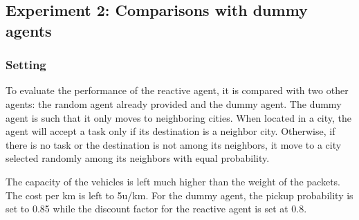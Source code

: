 \documentclass[11pt]{article}
\begin{document}
\subsection{Experiment 2: Comparisons with dummy agents}

\subsubsection{Setting}
To evaluate the performance of the reactive agent, it is compared with two other agents: the random agent already provided and the dummy agent. The dummy agent is such that it only moves to neighboring cities. When located in a city, the agent will accept a task only if its destination is a neighbor city. Otherwise, if there is no task or the destination is not among its neighbors, it move to a city selected randomly among its neighbors with equal probability. 

The capacity of the vehicles is left much higher than the weight of the packets. The cost per km is left to 5u/km. For the dummy agent, the pickup probability is set to 0.85 while the discount factor for the reactive agent is set at 0.8. 
\end{document}
